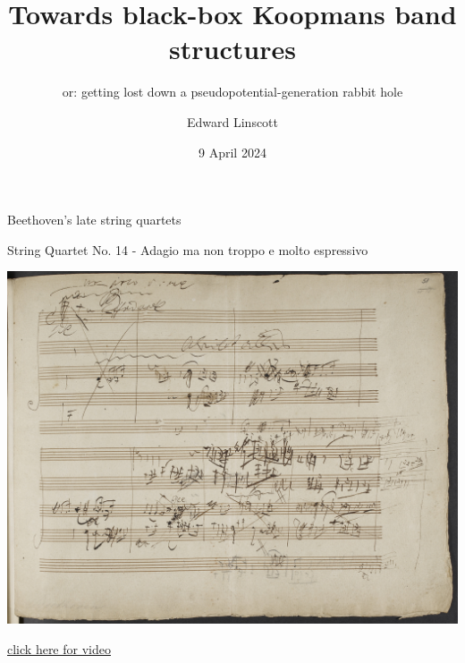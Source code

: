 \documentclass[xcolor=table,aspectratio=169]{beamer}
\author{Edward Linscott}
\institute{PSI}
\date{9 April 2024}
\title{Towards black-box Koopmans band structures}
\subtitle{or: getting lost down a pseudopotential-generation rabbit hole}
\numberwithin{equation}{section}
\begin{document}
\begin{frame}{Beethoven's late string quartets}
    \centering

    String Quartet No. 14 - Adagio ma non troppo e molto espressivo

    \vspace{6pt}

    \includegraphics[height=0.6\paperheight]{photos/beethoven.jpg}

    {\tiny \href{https://www.youtube.com/watch?v=JE_crvhG3Co\&t=454s\&ab_channel=DavidSukonick\#t=4m27s}{click here for video}}



\end{frame}

\frame{\titlepage}
\end{document}
